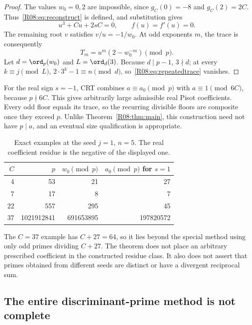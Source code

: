 \documentclass[11pt,a4paper]{article}
\theoremstyle{definition}\newtheorem{definition}[theorem]{Definition}
\theoremstyle{remark}\newtheorem{remark}[theorem]{Remark}
\begin{document}
\begin{proof}
The values $w_0=0,2$ are impossible, since $g_C(0)=-8$ and
$g_C(2)=2C$. Thus~\eqref{R08:eq:reconstruct} is defined, and substitution
gives
\[
                 u^3+Cu+2sC=0,\qquad f(u)=f'(u)=0.
\]
The remaining root $v$ satisfies $v/u=-1/w_0$.
At odd exponents $m$, the trace is consequently
\begin{equation}\label{R08:eq:repeatedtrace}
                         T_m=u^m(2-w_0^{-m})\pmod p.
\end{equation}
Let $d=\ord_p(w_0)$ and $L=\ord_d(3)$.
Because $d\mid p-1$, $3\nmid d$; at every $k\equiv j\pmod L$,
$2\cdot3^k-1\equiv n\pmod d$, so~\eqref{R08:eq:repeatedtrace} vanishes.
\end{proof}

For the real sign $s=-1$, CRT combines $a\equiv a_0\pmod p$ with
$a\equiv1\pmod{6C}$, because $p\nmid6C$.
This gives arbitrarily large admissible real Pisot coefficients.
Every odd floor equals its trace, so the recurring divisible floors
are composite once they exceed $p$. Unlike Theorem~\ref{R08:thm:main},
this construction need not have $p\mid a$, and an eventual size
qualification is appropriate.

\begin{table}[htbp]
\centering
\begin{tabular}{rrrr}
\toprule
$C$ & $p$ & $w_0\pmod p$ & $a_0\pmod p$ for $s=1$\\
\midrule
4 & 53 & 21 & 27\\
7 & 17 & 8 & 7\\
22 & 557 & 295 & 45\\
37 & 1021912841 & 691653895 & 197820572\\
\bottomrule
\end{tabular}
\caption{Exact examples at the seed $j=1$, $n=5$.
The real coefficient residue is the negative of the displayed one.}
\label{R08:tab:seeds}
\end{table}

The $C=37$ example has $C+27=64$, so it lies beyond the special method
using only odd primes dividing $C+27$.
The theorem does not place an arbitrary prescribed coefficient in the
constructed residue class. It also does not assert that primes obtained
from different seeds are distinct or have a divergent reciprocal sum.

\subsection{The entire discriminant-prime method is not complete}
\end{document}
